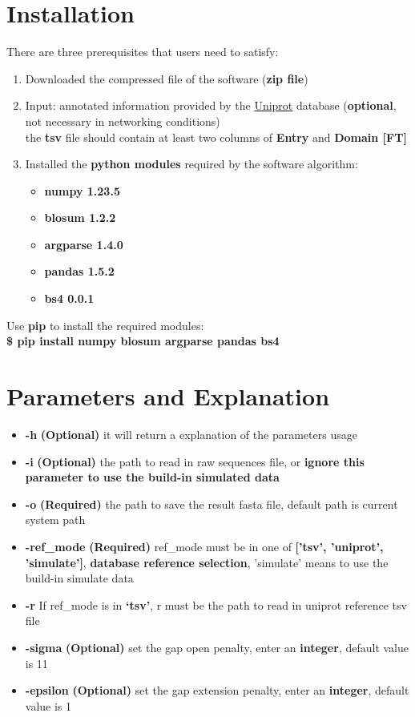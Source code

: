 \documentclass{article}
\begin{document}
\section{Installation}
There are three prerequisites that users need to satisfy:
\begin{enumerate}
\item Downloaded the compressed file of the software (\textbf{zip file})
\item Input: annotated information provided by the \href{https://www.uniprot.org/}{Uniprot} database (\textbf{optional}, not necessary in networking conditions)\\
the \textbf{tsv} file should contain at least two columns of \textbf{Entry} and \textbf{Domain [FT]}
\item Installed the \textbf{python modules} required by the software algorithm:
\begin{itemize}
\item \textbf{numpy 1.23.5}
\item \textbf{blosum 1.2.2}
\item \textbf{argparse 1.4.0}
\item \textbf{pandas 1.5.2}
\item \textbf{bs4 0.0.1}
\end{itemize}
\end{enumerate}

\noindent Use \textbf{pip} to install the required modules:\\
\textbf{\$ pip install numpy blosum argparse pandas bs4}

\section{Parameters and Explanation}
\begin{itemize}
\item \textbf{-h}  \textbf{(Optional)} it will return a explanation of the parameters usage
\item \textbf{-i}  \textbf{(Optional)} the path to read in raw sequences file, or \textbf{ignore this parameter to use the build-in simulated data}
\item \textbf{-o}  \textbf{(Required)} the path to save the result fasta file, default path is current system path
\item \textbf{-ref\_mode}  \textbf{(Required)} ref\_mode must be in one of \textbf{['tsv', 'uniprot', 'simulate']}, \textbf{database reference selection}, 'simulate' means to use the build-in simulate data
\item \textbf{-r}  If ref\_mode is in \textbf{‘tsv’}, r must be the path to read in uniprot reference tsv file
\item \textbf{-sigma}  \textbf{(Optional)} set the gap open penalty, enter an \textbf{integer}, default value is 11
\item \textbf{-epsilon}  \textbf{(Optional)} set the gap extension penalty, enter an \textbf{integer}, default value is 1
\end{itemize}
\end{document}
